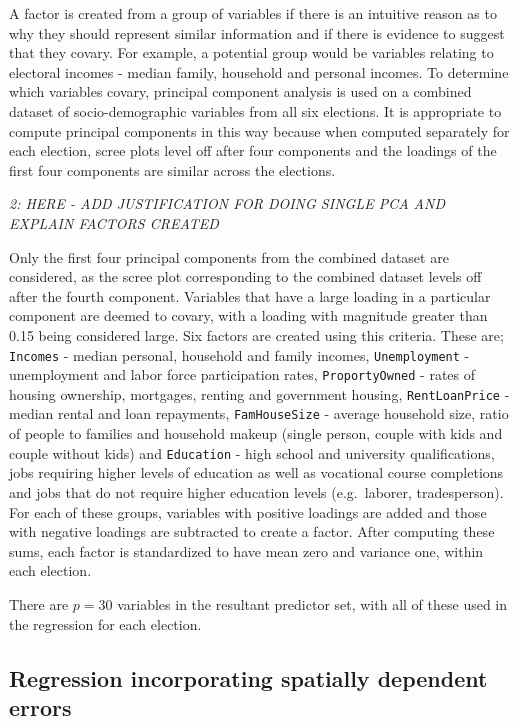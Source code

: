 \documentclass[11pt,a4paper,]{article}
\begin{document}
A factor is created from a group of variables if there is an intuitive reason as to why they should represent similar information and if there is evidence to suggest that they covary. For example, a potential group would be variables relating to electoral incomes - median family, household and personal incomes. To determine which variables covary, principal component analysis is used on a combined dataset of socio-demographic variables from all six elections. It is appropriate to compute principal components in this way because when computed separately for each election, scree plots level off after four components and the loadings of the first four components are similar across the elections.

\emph{2: HERE - ADD JUSTIFICATION FOR DOING SINGLE PCA AND EXPLAIN FACTORS CREATED}

Only the first four principal components from the combined dataset are considered, as the scree plot corresponding to the combined dataset levels off after the fourth component. Variables that have a large loading in a particular component are deemed to covary, with a loading with magnitude greater than 0.15 being considered large. Six factors are created using this criteria. These are; \texttt{Incomes} - median personal, household and family incomes, \texttt{Unemployment} - unemployment and labor force participation rates, \texttt{ProportyOwned} - rates of housing ownership, mortgages, renting and government housing, \texttt{RentLoanPrice} - median rental and loan repayments, \texttt{FamHouseSize} - average household size, ratio of people to families and household makeup (single person, couple with kids and couple without kids) and \texttt{Education} - high school and university qualifications, jobs requiring higher levels of education as well as vocational course completions and jobs that do not require higher education levels (e.g.~laborer, tradesperson). For each of these groups, variables with positive loadings are added and those with negative loadings are subtracted to create a factor. After computing these sums, each factor is standardized to have mean zero and variance one, within each election.

There are \(p=30\) variables in the resultant predictor set, with all of these used in the regression for each election.

\hypertarget{regression-incorporating-spatially-dependent-errors}{%
\subsection{Regression incorporating spatially dependent errors}\label{regression-incorporating-spatially-dependent-errors}}
\end{document}

